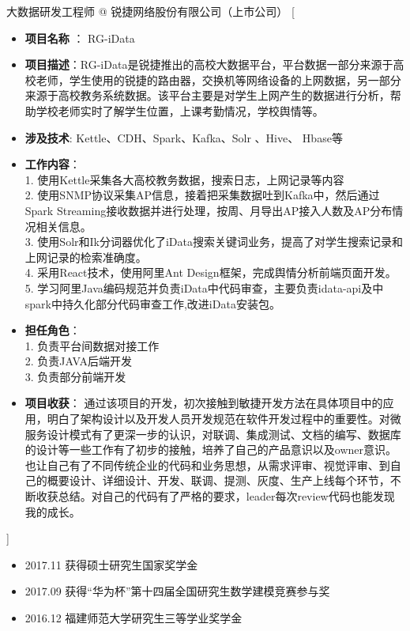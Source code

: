 \documentclass[zh]{resume}
\begin{document}
\begin{experiences}
  \separator{0.5ex}
    {大数据研发工程师 @ 锐捷网络股份有限公司（上市公司）}%
    [\begin{itemize}
      \item {\bfseries 项目名称} ： RG-iData
      \item {\bfseries 项目描述}：RG-iData是锐捷推出的高校大数据平台，平台数据一部分来源于高校老师，学生使用的锐捷的路由器，交换机等网络设备的上网数据，另一部分来源于高校教务系统数据。该平台主要是对学生上网产生的数据进行分析，帮助学校老师实时了解学生位置，上课考勤情况，学校舆情等。
      \item {\bfseries 涉及技术}: Kettle、CDH、Spark、Kafka、Solr 、Hive、 Hbase等
      \item {\bfseries 工作内容}：\\
      1. 使用Kettle采集各大高校教务数据，搜索日志，上网记录等内容 \\ 
      2. 使用SNMP协议采集AP信息，接着把采集数据吐到Kafka中，然后通过Spark Streaming接收数据并进行处理，按周、月导出AP接入人数及AP分布情况相关信息。\\
      3. 使用Solr和Ik分词器优化了iData搜索关键词业务，提高了对学生搜索记录和上网记录的检索准确度。\\
      4. 采用React技术，使用阿里Ant Design框架，完成舆情分析前端页面开发。\\
      5. 学习阿里Java编码规范并负责iData中代码审查，主要负责idata-api及中spark中持久化部分代码审查工作,改进iData安装包。
     \item {\bfseries 担任角色}：\\
      1. 负责平台间数据对接工作 \\
      2. 负责JAVA后端开发 \\
      3. 负责部分前端开发 
      \item {\bfseries 项目收获}：
      通过该项目的开发，初次接触到敏捷开发方法在具体项目中的应用，明白了架构设计以及开发人员开发规范在软件开发过程中的重要性。对微服务设计模式有了更深一步的认识，对联调、集成测试、文档的编写、数据库的设计等一些工作有了初步的接触，培养了自己的产品意识以及owner意识。也让自己有了不同传统企业的代码和业务思想，从需求评审、视觉评审、到自己的概要设计、详细设计、开发、联调、提测、灰度、生产上线每个环节，不断收获总结。对自己的代码有了严格的要求，leader每次review代码也能发现我的成长。\\
    \end{itemize}]
\end{experiences}

\begin{itemize}
  \item 2017.11 获得硕士研究生国家奖学金
  \item 2017.09 获得“华为杯”第十四届全国研究生数学建模竞赛参与奖
  \item 2016.12 福建师范大学研究生三等学业奖学金
\end{itemize}
\end{document}
